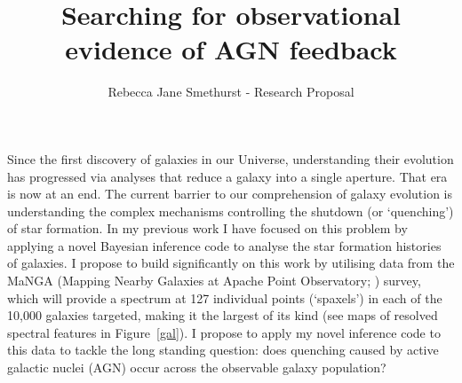 \documentclass[11pt]{article}
\title{{\bf \large \vspace{-2.5em} Searching for observational evidence of AGN feedback}\vspace{-1.0em}}
\author{\normalsize \vspace{-1.5em} Rebecca Jane Smethurst - Research Proposal}
\date{}
\begin{document}
\vspace{-1.5em}
\maketitle
\vspace{-2.0em}

%

Since the first discovery of galaxies in our Universe, understanding their evolution has progressed via analyses that reduce a galaxy into a single aperture. That era is now at an end. The current barrier to our comprehension of galaxy evolution is understanding the complex mechanisms controlling the shutdown (or `quenching') of star formation. In my previous work I have focused on this problem by applying a novel Bayesian inference code \citep[first described in][]{smethurst15} to analyse the star formation histories of galaxies. I propose to build significantly on this work by utilising data from the MaNGA (Mapping Nearby Galaxies at Apache Point Observatory; \citealt{Bundy15}) survey, which will provide a spectrum at 127 individual points (`spaxels') in each of the 10,000 galaxies targeted, making it the largest of its kind (see maps of resolved spectral features in Figure~\ref{gal}). I propose to apply my novel inference code to this data to tackle the long standing question: does quenching caused by active galactic nuclei (AGN) occur across the observable galaxy population? 
\end{document}
